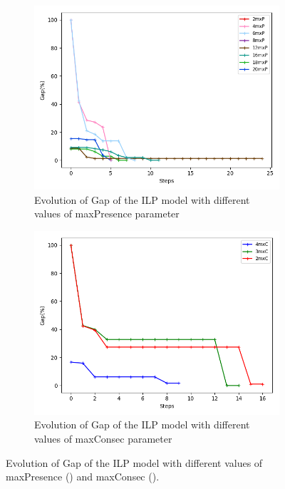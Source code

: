 \begin{figure}[h!]
\begin{subfigure}[b]{.49\linewidth}
\centering
\includegraphics[width=\linewidth]{./img/instances_maxpresence_ilp_evol.png}
\caption{Evolution of Gap of the ILP model with different values of maxPresence parameter }\label{fig1c}
\end{subfigure}
\begin{subfigure}[b]{.49\linewidth}
\centering
\includegraphics[width=\linewidth]{./img/instances_maxconsec_ilp_evol.png}
\caption{Evolution of Gap of the ILP model with different values of maxConsec parameter }\label{fig1d}
\end{subfigure}
\caption{Evolution of Gap of the ILP model with different values of maxPresence () and maxConsec ().  }
\label{fig_ilp_size2}
\end{figure}


